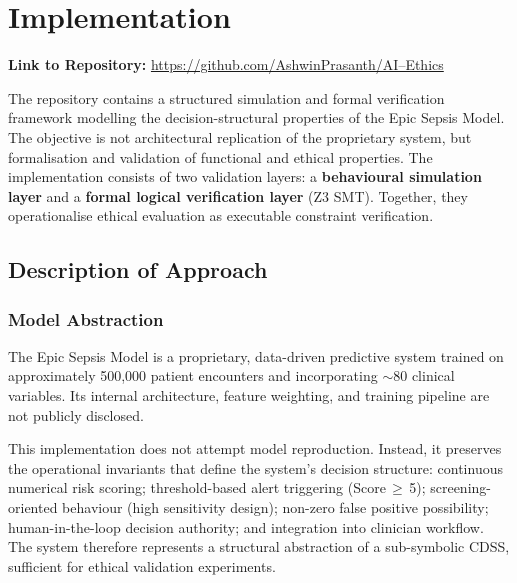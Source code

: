 \documentclass[]{UCD_CS_41820_Report}
\begin{document}
\chapter{Implementation}

\textbf{Link to Repository:}
\href{https://github.com/AshwinPrasanth/AI--Ethics}{https://github.com/AshwinPrasanth/AI--Ethics}

The repository contains a structured simulation and formal verification framework
modelling the decision-structural properties of the Epic Sepsis Model. The objective
is not architectural replication of the proprietary system, but formalisation and
validation of functional and ethical properties. The implementation consists of two
validation layers: a \textbf{behavioural simulation layer} and a \textbf{formal
logical verification layer} (Z3 SMT). Together, they operationalise ethical
evaluation as executable constraint verification.

\section{Description of Approach}

\subsection{Model Abstraction}

The Epic Sepsis Model is a proprietary, data-driven predictive system trained on
approximately 500,000 patient encounters and incorporating $\sim$80 clinical
variables. Its internal architecture, feature weighting, and training pipeline
are not publicly disclosed.

This implementation does not attempt model reproduction. Instead, it preserves the
operational invariants that define the system's decision structure: continuous
numerical risk scoring; threshold-based alert triggering (Score\,$\geq$\,5);
screening-oriented behaviour (high sensitivity design); non-zero false positive
possibility; human-in-the-loop decision authority; and integration into clinician
workflow. The system therefore represents a structural abstraction of a sub-symbolic
CDSS, sufficient for ethical validation experiments.

\end{document}
